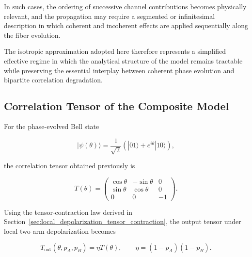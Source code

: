 \medskip

In such cases, the ordering of successive channel contributions becomes physically relevant, and the propagation may require a segmented or infinitesimal description in which coherent and incoherent effects are applied sequentially along the fiber evolution.

\medskip

The isotropic approximation adopted here therefore represents a simplified effective regime in which the analytical structure of the model remains tractable while preserving the essential interplay between coherent phase evolution and bipartite correlation degradation.

\medskip


\subsection{Correlation Tensor of the Composite Model}

For the phase-evolved Bell state

\begin{equation}
|\psi(\theta)\rangle
=
\frac{1}{\sqrt{2}}
\left(
|01\rangle
+
e^{i\theta}|10\rangle
\right),
\label{eq:composite_phase_bell_state}
\end{equation}

the correlation tensor obtained previously is

\begin{equation}
T(\theta)
=
\begin{pmatrix}
\cos\theta & -\sin\theta & 0 \\
\sin\theta & \cos\theta & 0 \\
0 & 0 & -1
\end{pmatrix}.
\label{eq:composite_phase_tensor}
\end{equation}

Using the tensor-contraction law derived in Section~\ref{sec:local_depolarization_tensor_contraction}, the output tensor under local two-arm depolarization becomes

\begin{equation}
T_{\mathrm{out}}(\theta,p_A,p_B)
=
\eta
T(\theta),
\qquad
\eta=(1-p_A)(1-p_B).
\label{eq:composite_tensor_contraction}
\end{equation}


